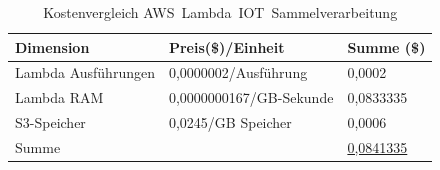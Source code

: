 \begin{table}[H]
\centering
\begin{tabular}{|l|l|l|}
\hline
Dimension & Preis(\$)/Einheit & Summe (\$) \\ \hline
Lambda Ausführungen & 0,0000002/Ausführung & 0,0002 \\ \hline
Lambda \ac{RAM} & 0,0000000167/GB-Sekunde & 0,0833335 \\ \hline
\ac{S3}-Speicher & 0,0245/GB Speicher & 0,0006 \\ \hline
Summe &  & \underline{0,0841335} \\ \hline
\end{tabular}
\caption{Kostenvergleich AWS~Lambda~IOT~Sammelverarbeitung}
\label{tab:kostenvergleich-AWS~Lambda~IOT~Sammelverarbeitung}
\end{table}

